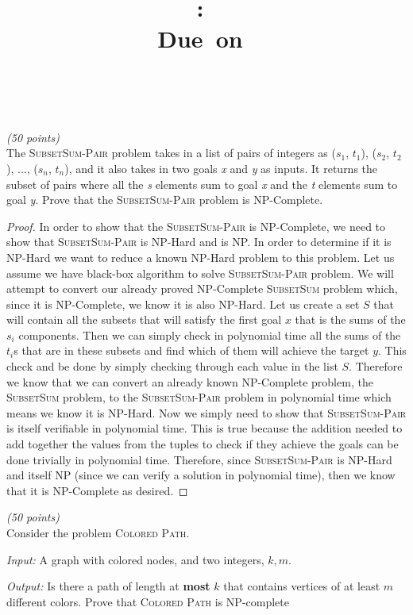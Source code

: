 \documentclass{article}
\title{
    \vspace{2in}
    \textmd{\textbf{\hmwkClass:\ \hmwkTitle}}\\
    \normalsize\vspace{0.1in}\small{Due\ on\ \hmwkDueDate}\\
    \vspace{0.1in}\large{\textit{\hmwkClassInstructor\ \hmwkClassTime}}
    \vspace{3in}
}
\author{\hmwkAuthorName}
\date{}
\newcounter{ProblemCounter}
\newenvironment{problem}[1][Problem]{
 \begin{trivlist}
 \item[\hskip \labelsep {\bfseries #1}\hskip \labelsep {%
 \bfseries \theProblemCounter.%
 \stepcounter{ProblemCounter}%
 }]
}{
 \end{trivlist}
}
\begin{document}
\maketitle

\clearpage

\begin{problem}\textit{(50 points)}\\
The \textsc{SubsetSum-Pair} problem takes in a list of pairs of integers as ($s_1$, $t_1$), ($s_2$, $t_2$), ..., ($s_n$, $t_n$), and it also takes in two goals \textit{x} and \textit{y} as inputs. It returns the subset of pairs where all the \textit{s} elements sum to goal \textit{x} and the \textit{t} elements sum to goal \textit{y}. Prove that the \textsc{SubsetSum-Pair} problem is NP-Complete.
\end{problem}

\begin{proof}
In order to show that the \textsc{SubsetSum-Pair} is NP-Complete, we need to show that \textsc{SubsetSum-Pair} is NP-Hard and is NP. In order to determine if it is NP-Hard we want to reduce a known NP-Hard problem to this problem. Let us assume we have black-box algorithm to solve \textsc{SubsetSum-Pair} problem. We will attempt to convert our already proved NP-Complete \textsc{SubsetSum} problem which, since it is NP-Complete, we know it is also NP-Hard. Let us create a set $S$ that will contain all the subsets that will satisfy the first goal $x$ that is the sums of the $s_i$ components. Then we can simply check in polynomial time all the sums of the $t_i$s that are in these subsets and find which of them will achieve the target $y$. This check and be done by simply checking through each value in the list $S.$ Therefore we know that we can convert an already known NP-Complete problem, the \textsc{SubsetSum} problem, to the \textsc{SubsetSum-Pair} problem in polynomial time which means we know it is NP-Hard. Now we simply need to show that \textsc{SubsetSum-Pair} is itself verifiable in polynomial time. This is true because the addition needed to add together the values from the tuples to check if they achieve the goals can be done trivially in polynomial time. Therefore, since \textsc{SubsetSum-Pair} is NP-Hard and itself NP (since we can verify a solution in polynomial time), then we know that it is NP-Complete as desired.
\end{proof}

\clearpage

\begin{problem}\textit{(50 points)}\\
    Consider the problem \textsc{Colored Path}.
    
    \textit{Input: } A graph with colored nodes, and two integers, $k, m$.
    
    \textit{Output: } Is there a path of length at \textbf{most} $k$ that contains vertices of at least $m$ different colors.
Prove that \textsc{Colored Path} is NP-complete
\end{problem}
\end{document}
